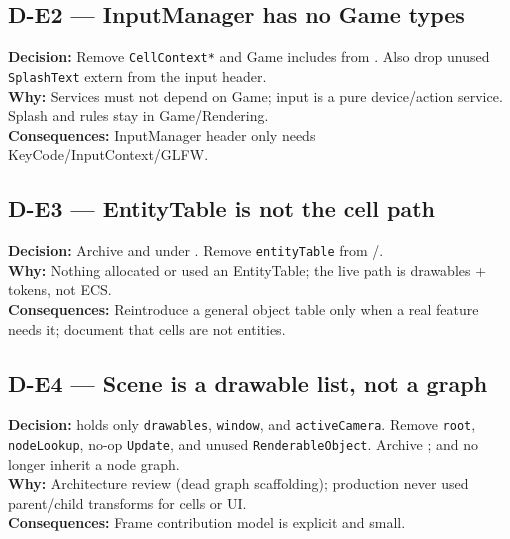 \subsection*{D-E2 --- InputManager has no Game types}
\begin{decisionbox}[title={D-E2 \quad 2026-07-28}]
\textbf{Decision:} Remove \texttt{CellContext*} and Game includes from
. Also drop unused \texttt{SplashText} extern from the
input header.\\
\textbf{Why:} Services must not depend on Game; input is a pure device/action
service. Splash and rules stay in Game/Rendering.\\
\textbf{Consequences:} InputManager header only needs KeyCode/InputContext/GLFW.
\end{decisionbox}

\subsection*{D-E3 --- EntityTable is not the cell path}
\begin{decisionbox}[title={D-E3 \quad 2026-07-28}]
\textbf{Decision:} Archive  and 
under . Remove \texttt{entityTable} from
/.\\
\textbf{Why:} Nothing allocated or used an EntityTable; the live path is
drawables + tokens, not ECS.\\
\textbf{Consequences:} Reintroduce a general object table only when a real
feature needs it; document that cells are not entities.
\end{decisionbox}

\subsection*{D-E4 --- Scene is a drawable list, not a graph}
\begin{decisionbox}[title={D-E4 \quad 2026-07-28}]
\textbf{Decision:}  holds only \texttt{drawables},
\texttt{window}, and \texttt{activeCamera}. Remove \texttt{root},
\texttt{nodeLookup}, no-op \texttt{Update}, and unused
\texttt{RenderableObject}. Archive ; 
and  no longer inherit a node graph.\\
\textbf{Why:} Architecture review (dead graph scaffolding); production never
used parent/child transforms for cells or UI.\\
\textbf{Consequences:} Frame contribution model is explicit and small.
\end{decisionbox}

